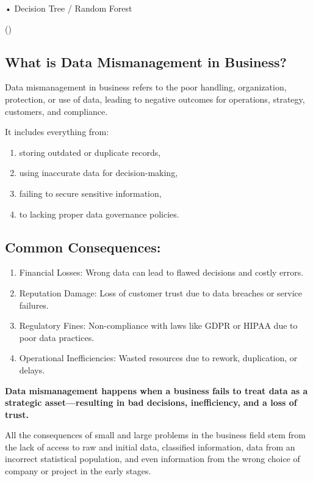 \documentclass[
  man,
  floatsintext,
  longtable,
  nolmodern,
  notxfonts,
  notimes,
  colorlinks=true,linkcolor=blue,citecolor=blue,urlcolor=blue]{apa7}
\providecommand{\tightlist}{%
  \setlength{\itemsep}{0pt}\setlength{\parskip}{0pt}}
\begin{document}
• Decision Tree / Random Forest

()

\subsection{What is Data Mismanagement in
Business?}\label{what-is-data-mismanagement-in-business}

Data mismanagement in business refers to the poor handling,
organization, protection, or use of data, leading to negative outcomes
for operations, strategy, customers, and compliance.

It includes everything from:

\begin{enumerate}
\def\labelenumi{\arabic{enumi}.}
\tightlist
\item
  storing outdated or duplicate records,
\item
  using inaccurate data for decision-making,
\item
  failing to secure sensitive information,
\item
  to lacking proper data governance policies.
\end{enumerate}

\subsection{\texorpdfstring{\textbf{Common
Consequences:}}{Common Consequences:}}\label{common-consequences}

\begin{enumerate}
\def\labelenumi{\arabic{enumi}.}
\item
  Financial Losses: Wrong data can lead to flawed decisions and costly
  errors.
\item
  Reputation Damage: Loss of customer trust due to data breaches or
  service failures.
\item
  Regulatory Fines: Non-compliance with laws like GDPR or HIPAA due to
  poor data practices.
\item
  Operational Inefficiencies: Wasted resources due to rework,
  duplication, or delays.
\end{enumerate}

\textbf{Data mismanagement happens when a business fails to treat data
as a strategic asset---resulting in bad decisions, inefficiency, and a
loss of trust.}

All the consequences of small and large problems in the business field
stem from the lack of access to raw and initial data, classified
information, data from an incorrect statistical population, and even
information from the wrong choice of company or project in the early
stages.
\end{document}
